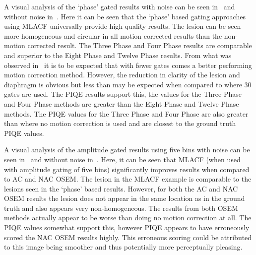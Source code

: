             A visual analysis of the `phase' gated results with noise can be seen in~ and without noise in~. Here it can be seen that the `phase' based gating approaches using \gls{MLACF} universally provide high quality results. The lesion can be seen more homogeneous and circular in all motion corrected results than the non-motion corrected result. The Three Phase and Four Phase results are comparable and superior to the Eight Phase and Twelve Phase results. From what was observed in~ it is to be expected that with fewer gates comes a better performing motion correction method. However, the reduction in clarity of the lesion and diaphragm is obvious but less than may be expected when compared to where $30$ gates are used. The \gls{PIQE} results support this, the values for the Three Phase and Four Phase methods are greater than the Eight Phase and Twelve Phase methods. The \gls{PIQE} values for the Three Phase and Four Phase are also greater than where no motion correction is used and are closest to the ground truth \gls{PIQE} values.
            
            A visual analysis of the amplitude gated results using five bins with noise can be seen in~ and without noise in~. Here, it can be seen that \gls{MLACF} (when used with amplitude gating of five bins) significantly improves results when compared to \gls{AC} and \gls{NAC} \gls{OSEM}. The lesion in the \gls{MLACF} example is comparable to the lesions seen in the `phase' based results. However, for both the \gls{AC} and \gls{NAC} \gls{OSEM} results the lesion does not appear in the same location as in the ground truth and also appears very non-homogeneous. The results from both \gls{OSEM} methods actually appear to be worse than doing no motion correction at all. The \gls{PIQE} values somewhat support this, however \gls{PIQE} appears to have erroneously scored the \gls{NAC} \gls{OSEM} results highly. This erroneous scoring could be attributed to this image being smoother and thus potentially more perceptually pleasing.
            
